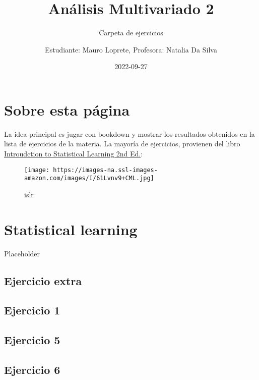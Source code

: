 \documentclass[
]{book}
\title{Análisis Multivariado 2}
\subtitle{Carpeta de ejercicios}
\author{Estudiante: Mauro Loprete, Profesora: Natalia Da Silva}
\date{2022-09-27}
\begin{document}
\frontmatter
\maketitle

\mainmatter
\hypertarget{sobre-esta-puxe1gina}{%
\chapter{Sobre esta página}\label{sobre-esta-puxe1gina}}

La idea principal es jugar con bookdown y mostrar los resultados
obtenidos en la lista de ejercicios de la materia. La mayoría de
ejercicios, provienen del libro
\href{https://www.statlearning.com/}{Introudction to Statistical
Learning 2nd Ed.}:

\begin{figure}
\centering
\texttt{[image: https://images-na.ssl-images-amazon.com/images/I/61Lvnv9+CML.jpg]}
\caption{islr}
\end{figure}

\hypertarget{statistical-learning}{%
\chapter{Statistical learning}\label{statistical-learning}}

Placeholder

\hypertarget{ejercicio-extra}{%
\section*{Ejercicio extra}\label{ejercicio-extra}}

\hypertarget{ejercicio-1}{%
\section*{Ejercicio 1}\label{ejercicio-1}}

\hypertarget{ejercicio-5}{%
\section*{Ejercicio 5}\label{ejercicio-5}}

\hypertarget{ejercicio-6}{%
\section*{Ejercicio 6}\label{ejercicio-6}}
\end{document}
